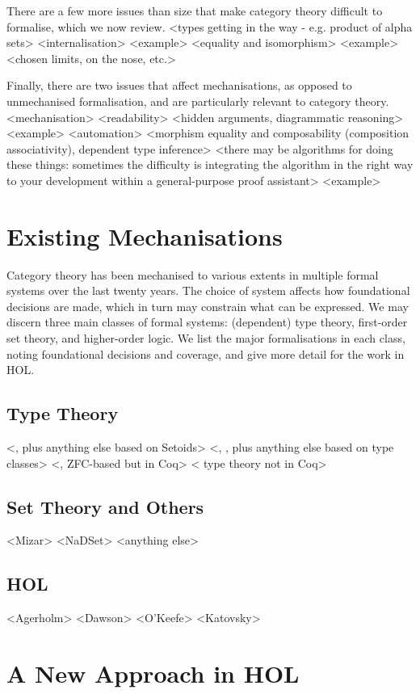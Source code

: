 \documentclass[twoside,titlepage,11pt]{article}
\begin{document}
There are a few more issues than size that make category theory difficult to formalise, which we now review.
<types getting in the way - e.g. product of alpha sets>
<internalisation>%
  <example>
<equality and isomorphism>%
  <example>
  <chosen limits, on the nose, etc.>

Finally, there are two issues that affect mechanisations, as opposed to unmechanised formalisation, and are particularly relevant to category theory.
<mechanisation>
  <readability>%
    <hidden arguments, diagrammatic reasoning>
    <example>
  <automation>%
    <morphism equality and composability (composition associativity), dependent type inference> 
    <there may be algorithms for doing these things: sometimes the difficulty is integrating the algorithm in the right way to your development within a general-purpose proof assistant>
    <example>
\section{Existing Mechanisations}\label{sec:existing}%
Category theory has been mechanised to various extents in multiple formal systems over the last twenty years.
The choice of system affects how foundational decisions are made, which in turn may constrain what can be expressed.
We may discern three main classes of formal systems: (dependent) type theory, first-order set theory, and higher-order logic.
We list the major formalisations in each class, noting foundational decisions and coverage, and give more detail for the work in HOL.%
\subsection{Type Theory}%
  <\cite{DBLP:conf/birthday/HuetS00}, plus anything else based on Setoids>%
  <\cite{Megacz}, \cite{Sozeau}, plus anything else based on type classes>%
  <\cite{Simpson04}, ZFC-based but in Coq>%
  <\cite{weber02program,Wilander,DBLP:conf/cade/KozenKR06} type theory not in Coq>%
\subsection{Set Theory and Others}%
  <Mizar>%
  <NaDSet>%
  <anything else>%
\subsection{HOL}%
  <Agerholm>%
  <Dawson>%
  <O'Keefe>%
  <Katovsky>%
\section{A New Approach in HOL}%
\end{document}
